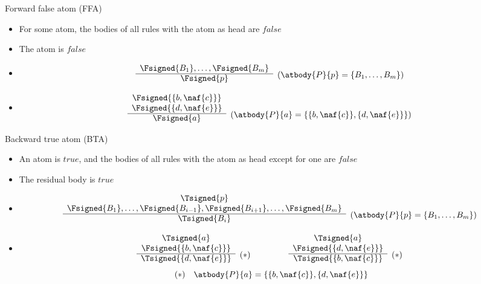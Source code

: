 \begin{frame}{Forward false atom (FFA)}
\begin{itemize}
\item {} For some atom, the bodies of all rules with the atom as head are $\mathit{false}$
\item {} The atom is $\mathit{false}$
\item {}
\[
\begin{array}{cl}
\Fsigned{B_1},\dots,\Fsigned{B_m} &
\raisebox{-8pt}[0pt][0pt]{($\atbody{P}{p} = \{B_1,\dots,B_m\}$)}
\\\cline{1-1}
\Fsigned{p}
\end{array}
\]
\item<2-> 
\[
\begin{array}{cl}
\Fsigned{\{b,\naf{c}\}} \\
\Fsigned{\{d,\naf{e}\}} &
\raisebox{-8pt}[0pt][0pt]{($\atbody{P}{a} = \{\{b,\naf{c}\},\{d,\naf{e}\}\}$)}
\\\cline{1-1}
\Fsigned{a}
\end{array}
\]
\end{itemize}
\end{frame}
\begin{frame}{Backward true atom (BTA)}
\begin{itemize}
\item {}
  An atom is $\mathit{true}$, and the bodies of all rules with the atom as head except for one are $\mathit{false}$
\item {} The residual body is $\mathit{true}$
\item {}
\[
\begin{array}{cl}
\Tsigned{p} \\
\Fsigned{B_1},\dots,\Fsigned{B_{i-1}},\Fsigned{B_{i+1}},\dots,\Fsigned{B_m} &
\raisebox{-8pt}[0pt][0pt]{($\atbody{P}{p} = \{B_1,\dots,B_m\}$)}
\\\cline{1-1}
\Tsigned{B_i}
\end{array}
\]
\item<2-> 
\[
\begin{array}{cl}
\Tsigned{a} \\
\Fsigned{\{b,\naf{c}\}} &
\raisebox{-8pt}[0pt][0pt]{$(*)$}
\\\cline{1-1}
\Tsigned{\{d,\naf{e}\}}
\end{array}
\qquad\qquad
\begin{array}{cl}
\Tsigned{a} \\
\Fsigned{\{d,\naf{e}\}} &
\raisebox{-8pt}[0pt][0pt]{$(*)$}
\\\cline{1-1}
\Tsigned{\{b,\naf{c}\}}
\end{array}
\hfill
\]
\[
\hfill
(*)\quad \atbody{P}{a} = \{\{b,\naf{c}\},\{d,\naf{e}\}\}
\hfill\hfill
\]
\end{itemize}
\end{frame}
